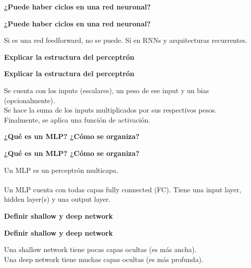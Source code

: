 \documentclass[10pt]{memoir}
\begin{document}
\clearpage
\begin{center}
	\textbf{\Large ¿Puede haber ciclos en una red neuronal?} \\
\end{center}

\clearpage
\begin{center}
	\textbf{\Large ¿Puede haber ciclos en una red neuronal?} \\
\end{center}
\noindent Si es una red feedforward, no se puede. Sí en RNNs y arquitecturas recurrentes.

\clearpage
\begin{center}
	\textbf{\Large Explicar la estructura del perceptrón} \\
\end{center}

\clearpage
\begin{center}
	\textbf{\Large Explicar la estructura del perceptrón} \\
\end{center}
\noindent Se cuenta con los inputs (escalares), un peso de ese input y un bias (opcionalmente). \\
Se hace la suma de los inputs multiplicados por sus respectivos pesos. \\
Finalmente, se aplica una función de activación.

\clearpage
\begin{center}
	\textbf{\Large ¿Qué es un MLP? ¿Cómo se organiza?} \\
\end{center}

\clearpage
\begin{center}
	\textbf{\Large ¿Qué es un MLP? ¿Cómo se organiza?} \\
\end{center}
\noindent Un MLP es un perceptrón multicapa. \\
\\
\noindent Un MLP cuenta con todas capas fully connected (FC). Tiene una input layer, hidden layer(s) y una output layer.

\clearpage
\begin{center}
	\textbf{\Large Definir shallow y deep network} \\
\end{center}

\clearpage
\begin{center}
	\textbf{\Large Definir shallow y deep network} \\
\end{center}
\noindent Una shallow network tiene pocas capas ocultas (es más ancha).
\\
\noindent Una deep network tiene muchas capas ocultas (es más profunda).
\end{document}
